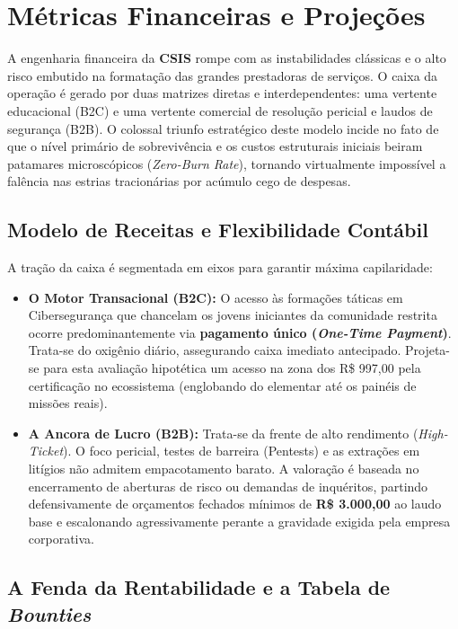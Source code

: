\documentclass[../main.tex]{subfiles}
\begin{document}
\section{Métricas Financeiras e Projeções}

A engenharia financeira da \textbf{CSIS} rompe com as instabilidades clássicas e o alto risco embutido na formatação das grandes prestadoras de serviços. O caixa da operação é gerado por duas matrizes diretas e interdependentes: uma vertente educacional (B2C) e uma vertente comercial de resolução pericial e laudos de segurança (B2B). O colossal triunfo estratégico deste modelo incide no fato de que o nível primário de sobrevivência e os custos estruturais iniciais beiram patamares microscópicos (\textit{Zero-Burn Rate}), tornando virtualmente impossível a falência nas estrias tracionárias por acúmulo cego de despesas.

\subsection{Modelo de Receitas e Flexibilidade Contábil}

A tração da caixa é segmentada em eixos para garantir máxima capilaridade:

\begin{itemize}
    \item \textbf{O Motor Transacional (B2C):} O acesso às formações táticas em Cibersegurança que chancelam os jovens iniciantes da comunidade restrita ocorre predominantemente via \textbf{pagamento único (\textit{One-Time Payment})}. Trata-se do oxigênio diário, assegurando caixa imediato antecipado. Projeta-se para esta avaliação hipotética um acesso na zona dos R\$ 997,00 pela certificação no ecossistema (englobando do elementar até os painéis de missões reais).
    \item \textbf{A Ancora de Lucro (B2B):} Trata-se da frente de alto rendimento (\textit{High-Ticket}). O foco pericial, testes de barreira (Pentests) e as extrações em litígios não admitem empacotamento barato. A valoração é baseada no encerramento de aberturas de risco ou demandas de inquéritos, partindo defensivamente de orçamentos fechados mínimos de \textbf{R\$ 3.000,00} ao laudo base e escalonando agressivamente perante a gravidade exigida pela empresa corporativa.
\end{itemize}

\subsection{A Fenda da Rentabilidade e a Tabela de \textit{Bounties}}
\end{document}
